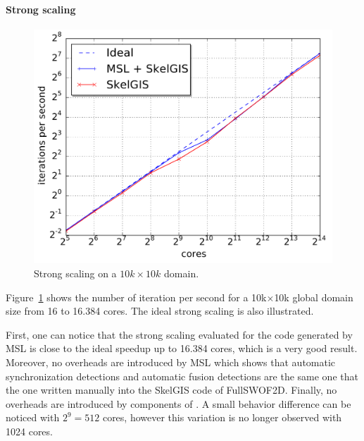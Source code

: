 \paragraph{\textbf{Strong scaling}}
\begin{figure}[t]\begin{center}
  \includegraphics[width=.6\textwidth]{../results/strong_scaling/10K_1K/median_strong.pdf}
  \caption{Strong scaling on a $10k \times 10k$ domain.}
  \label{fig:strong}
\end{center}\end{figure}
Figure~\ref{fig:strong} shows the number of iteration per second for a 10k$\times$10k global domain size from 16 to 16.384 cores.
The ideal strong scaling is also illustrated.

First, one can notice that the strong scaling evaluated for the code generated by MSL is close to the ideal speedup up to 16.384 cores, which is a very good result. Moreover, no overheads are introduced by MSL which shows that automatic synchronization detections and automatic fusion detections are the same one that the one written manually into the SkelGIS code of FullSWOF2D. Finally, no overheads are introduced by components of \llc. A small behavior difference can be noticed with $2^9=512$ cores, however this variation is no longer observed with 1024 cores.

